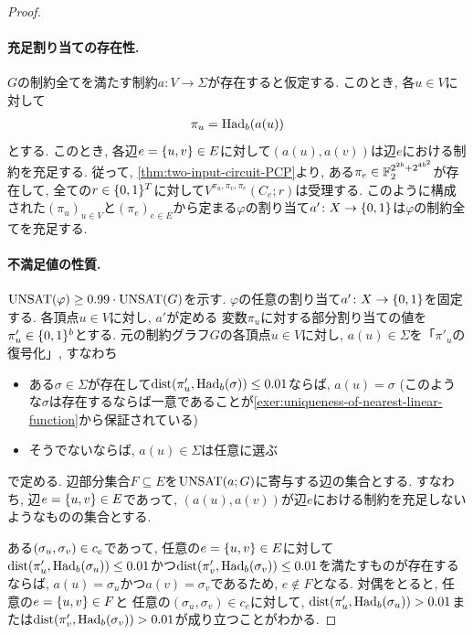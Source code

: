 \begin{proof}
  \paragraph*{充足割り当ての存在性.}
  $G$の制約全てを満たす制約$a\colon V\to\Sigma$が存在すると仮定する.
  このとき, 各$u\in V$に対して
  \begin{align*}
    \pi_u = \mathrm{Had}_b(a(u))
  \end{align*}
  とする. このとき, 各辺$e=\qty{u,v}\in E$に対して$(a(u),a(v))$は辺$e$における制約を充足する.
  従って, \cref{thm:two-input-circuit-PCP}より, ある$\pi_e\in \mathbb{F}_2^{2^{2b} + 2^{4b^2}}$が存在して, 全ての$r\in\{0,1\}^T$に対して$V^{\pi_u,\pi_v,\pi_e}(C_e;r)$は受理する.
  このように構成された$(\pi_u)_{u\in V}$と$(\pi_e)_{e\in E}$から定まる$\varphi$の割り当て$a'\colon X\to \{0,1\}$は$\varphi$の制約全てを充足する.

  \paragraph*{不満足値の性質.}
 $\mathrm{UNSAT}(\varphi)\ge 0.99\cdot\mathrm{UNSAT}(G)$を示す.
  $\varphi$の任意の割り当て$a'\colon X\to\{0,1\}$を固定する.
  各頂点$u\in V$に対し, $a'$が定める
  変数$\pi_u$に対する部分割り当ての値を$\pi'_u\in\{0,1\}^b$とする.
  元の制約グラフ$G$の各頂点$u\in V$に対し, $a(u)\in\Sigma$を「$\pi'_u$の復号化」, すなわち
  \begin{itemize}
    \item ある$\sigma\in\Sigma$が存在して$\mathrm{dist}(\pi'_u,\mathrm{Had}_b(\sigma)) \le 0.01$ならば, $a(u)=\sigma$ (このような$\sigma$は存在するならば一意であることが\cref{exer:uniqueness-of-nearest-linear-function}から保証されている)
    \item そうでないならば, $a(u)\in\Sigma$は任意に選ぶ
  \end{itemize}
  で定める.
  辺部分集合$F\subseteq E$を$\mathrm{UNSAT}(a;G)$に寄与する辺の集合とする. すなわち, 辺$e=\qty{u,v}\in E$であって, $(a(u),a(v))$が辺$e$における制約を充足しないようなものの集合とする.

  ある$\qty(\sigma_u,\sigma_v)\in c_e$であって,
  任意の$e=\qty{u,v}\in E$に対して$\mathrm{dist}(\pi'_u,\mathrm{Had}_b(\sigma_u))\le0.01$かつ$\mathrm{dist}(\pi'_v,\mathrm{Had}_b(\sigma_v))\le0.01$を満たすものが存在するならば, 
  $a(u)=\sigma_u$かつ$a(v)=\sigma_v$であるため, $e\not\in F$となる.
  対偶をとると, 任意の$e=\qty{u,v}\in F$と
    任意の$(\sigma_u,\sigma_v)\in c_e$に対して, $\mathrm{dist}(\pi'_u,\mathrm{Had}_b(\sigma_u))>0.01$または$\mathrm{dist}(\pi'_v,\mathrm{Had}_b(\sigma_v))>0.01$が成り立つことがわかる.
  

\end{proof}
